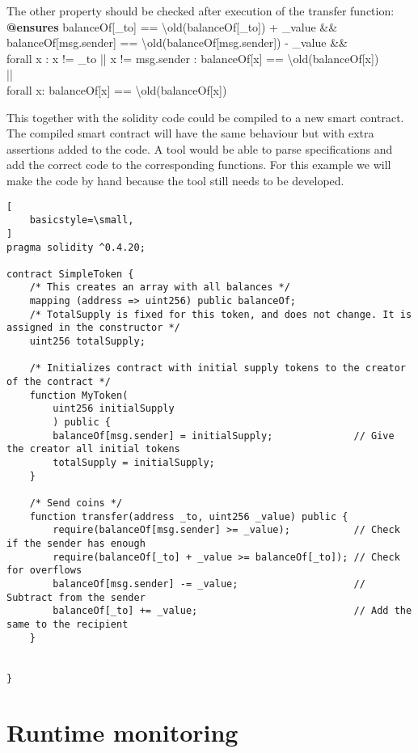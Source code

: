 \documentclass[a4paper]{article}
\begin{document}
The other property should be checked after execution of the transfer function: \\
 \textbf{@ensures} \qquad balanceOf[\_to] == \textbackslash old(balanceOf[\_to]) + \_value \&\&\\
		balanceOf[msg.sender] == \textbackslash old(balanceOf[msg.sender]) - \_value \&\&\\
		forall x : x != \_to ||  x != msg.sender : balanceOf[x] == \textbackslash old(balanceOf[x]) \\
		|| \\
        		forall x: balanceOf[x] == \textbackslash old(balanceOf[x])
 
This together with the solidity code could be compiled to a new smart contract. The compiled smart contract will have the same behaviour but with extra assertions added to the code. A tool would be able to parse specifications and add the correct code to the corresponding functions. For this example we will make the code by hand because the tool still needs to be developed.
\begin{lstlisting}[
    basicstyle=\small, 
]
pragma solidity ^0.4.20;

contract SimpleToken {
    /* This creates an array with all balances */
    mapping (address => uint256) public balanceOf;
	/* TotalSupply is fixed for this token, and does not change. It is assigned in the constructor */
	uint256 totalSupply;

    /* Initializes contract with initial supply tokens to the creator of the contract */
    function MyToken(
        uint256 initialSupply
        ) public {
        balanceOf[msg.sender] = initialSupply;              // Give the creator all initial tokens
		totalSupply = initialSupply;
    }

    /* Send coins */
    function transfer(address _to, uint256 _value) public {
        require(balanceOf[msg.sender] >= _value);           // Check if the sender has enough
        require(balanceOf[_to] + _value >= balanceOf[_to]); // Check for overflows
        balanceOf[msg.sender] -= _value;                    // Subtract from the sender
        balanceOf[_to] += _value;                           // Add the same to the recipient
    }


}
\end{lstlisting}


\section{Runtime monitoring} 
\end{document}
